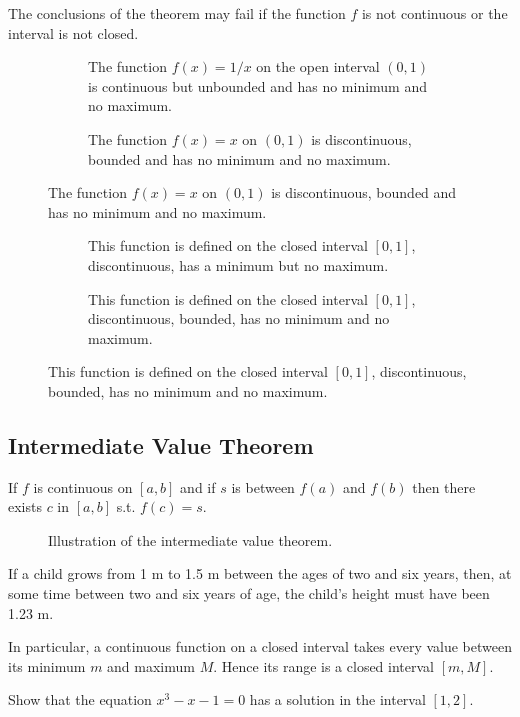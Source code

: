\documentclass[calc1-main.tex]{subfiles}
\begin{document}
\begin{example}
	The conclusions of the theorem may fail if the function $f$ is not continuous or the interval is not closed.

	\begin{figure}[H]
		\centering
		\begin{subfigure}[t]{0.4\textwidth}
			
			\caption{The function $f(x) = 1/x$ on the open interval $(0,1)$ is continuous but unbounded and has no minimum and no maximum.}
		\end{subfigure}
		\quad
		\begin{subfigure}[t]{0.4\textwidth}
			
			\caption{The function $f(x) = x$ on $(0,1)$ is discontinuous, bounded and has no minimum and no maximum.}
		\end{subfigure}
	\end{figure}

	\begin{figure}[H]
		\centering
		\begin{subfigure}[t]{0.4\textwidth}
			
			\caption{This function is defined on the closed interval $[0,1]$, discontinuous, has a minimum but no maximum.}
		\end{subfigure}
		\quad
		\begin{subfigure}[t]{0.4\textwidth}
			
			\caption{This function is defined on the closed interval $[0,1]$, discontinuous, bounded, has no minimum and no maximum.}
		\end{subfigure}
	\end{figure}
\end{example}

\subsection*{Intermediate Value Theorem}
\begin{theorem}
	If $f$ is continuous on $[a, b]$ and if $s$ is between $f(a)$ and $f(b)$ then there exists $c$ in $[a, b]$ s.t. $f(c) = s$.
\end{theorem}

\begin{figure}[H]
	\centering
	
	\caption{Illustration of the intermediate value theorem.}
\end{figure}

\begin{example}
	If a child grows from 1 m to 1.5 m between the ages of two and six years, then, at some time between two and six years of age, the child's height must have been 1.23 m.
\end{example}
In particular, a continuous function on a closed interval takes every value between its minimum $m$ and maximum $M$. Hence its range is a closed interval $[m, M]$.
\begin{example}
	Show that the equation $x^3 - x - 1 = 0$ has a solution in the interval $[1, 2]$.
\end{example}
\end{document}
